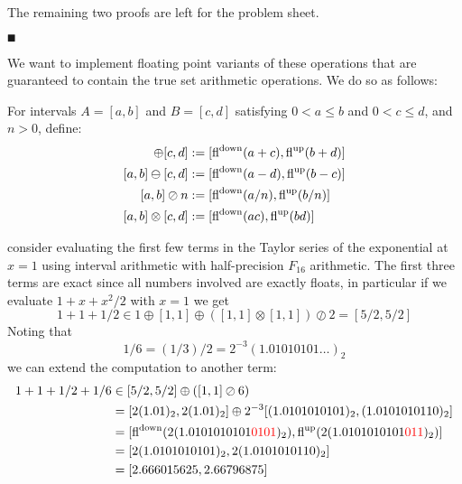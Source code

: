 The remaining two proofs are left for the problem sheet. 

\ensuremath{\QED}

We want to  implement floating point variants of these operations that are guaranteed to contain the true set arithmetic operations. We do so as follows:

\begin{definition} For intervals  $A = [a,b]$ and $B = [c,d]$ satisfying $0 < a \ensuremath{\leq} b$ and $0 < c \ensuremath{\leq} d$, and $n > 0$, define:
\begin{align*}
[a,b] \ensuremath{\oplus} [c,d] &:= [{\rm fl}^{\rm down}(a+c), {\rm fl}^{\rm up}(b+d)] \\
[a,b] \ensuremath{\ominus} [c,d] &:= [{\rm fl}^{\rm down}(a-d), {\rm fl}^{\rm up}(b-c)] \\
[a,b] \ensuremath{\oslash} n &:= [{\rm fl}^{\rm down}(a/n), {\rm fl}^{\rm up}(b/n)] \\
[a,b] \ensuremath{\otimes} [c,d] &:= [{\rm fl}^{\rm down}(ac), {\rm fl}^{\rm up}(bd)]
\end{align*}
\end{definition}

\begin{example} consider evaluating the first few terms in the Taylor series of the exponential at $x = 1$ using interval arithmetic with half-precision $F_{16}$ arithmetic.  The first three terms are exact since all numbers involved are exactly floats, in particular if we evaluate $1 + x + x^2/2$ with $x = 1$ we get
\[
1 + 1 + 1/2 \ensuremath{\in} 1 \ensuremath{\oplus} [1,1] \ensuremath{\oplus} ([1,1] \ensuremath{\otimes} [1,1]) \ensuremath{\oslash} 2 = [5/2, 5/2]
\]
Noting that 
\[
1/6 = (1/3)/2 = 2^{-3} (1.01010101\ensuremath{\ldots})_2
\]
we can extend the computation to another term:
\begin{align*}
1 + 1 + 1/2 + 1/6 &\ensuremath{\in} [5/2,5/2] \ensuremath{\oplus} ([1,1] \ensuremath{\oslash} 6) \ccr
= [2 (1.01)_2, 2 (1.01)_2] \ensuremath{\oplus} 2^{-3}[(1.0101010101)_2, (1.0101010110)_2] \ccr
= [{\rm fl}^{\rm down}(2 (1.0101010101\red{0101})_2), {\rm fl}^{\rm up}(2 (1.0101010101\red{011})_2)] \ccr
= [2(1.0101010101)_2, 2(1.0101010110)_2] \ccr 
= [2.666015625, 2.66796875]
\end{align*}
\end{example}

